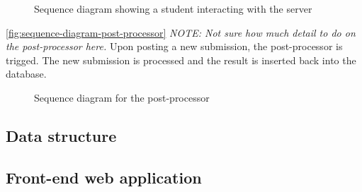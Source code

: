 \begin{figure}[H]
  \centering
  \caption[Student-server sequence diagram]{Sequence diagram showing a student interacting with the server}
  \label{fig:sequence-diagram-student-server}
\end{figure}

\autoref{fig:sequence-diagram-post-processor} \textit{NOTE: Not sure how much detail to do on the post-processor here.} Upon posting a new submission, the post-processor is trigged. The new submission is processed and the result is inserted back into the database.

\begin{figure}[H]
  \centering
  \caption[Post-processor sequence diagram]{Sequence diagram for the post-processor}
  \label{fig:sequence-diagram-post-processor}
\end{figure}

\subsection{Data structure}

\subsection{Front-end web application}

